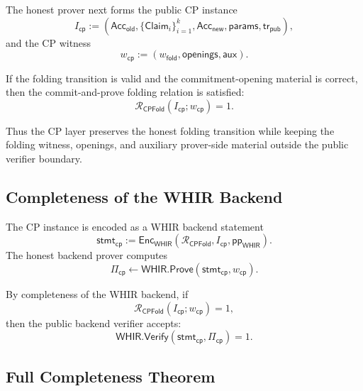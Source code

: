 \documentclass[11pt]{article}
\theoremstyle{definition}
\newcommand{\WHIR}{\mathsf{WHIR}}
\newcommand{\Acc}{\mathsf{Acc}}
\newcommand{\Verify}{\mathsf{Verify}}
\newcommand{\Prove}{\mathsf{Prove}}
\newcommand{\Rcp}{\mathcal{R}_{\mathsf{CPFold}}}
\begin{document}
The honest prover next forms the public CP instance
\[
  I_{\mathsf{cp}}
  :=
  \left(
    \Acc_{\mathsf{old}},
    \{\mathsf{Claim}_i\}_{i=1}^k,
    \Acc_{\mathsf{new}},
    \mathsf{params},
    \mathsf{tr}_{\mathsf{pub}}
  \right),
\]
and the CP witness
\[
  w_{\mathsf{cp}}
  :=
  \left(
    w_{\mathsf{fold}},
    \mathsf{openings},
    \mathsf{aux}
  \right).
\]

If the folding transition is valid and the commitment-opening material is
correct, then the commit-and-prove folding relation is satisfied:
\[
  \Rcp(I_{\mathsf{cp}};w_{\mathsf{cp}})=1.
\]

Thus the CP layer preserves the honest folding transition while keeping the
folding witness, openings, and auxiliary prover-side material outside the public
verifier boundary.

\subsection{Completeness of the WHIR Backend}
\label{sec:completeness-of-whir-backend}

The CP instance is encoded as a WHIR backend statement
\[
  \mathsf{stmt}_{\mathsf{cp}}
  :=
  \mathsf{Enc}_{\WHIR}
  \left(
    \Rcp,
    I_{\mathsf{cp}},
    \mathsf{pp}_{\WHIR}
  \right).
\]
The honest backend prover computes
\[
  \Pi_{\mathsf{cp}}
  \leftarrow
  \WHIR.\Prove(\mathsf{stmt}_{\mathsf{cp}},w_{\mathsf{cp}}).
\]

By completeness of the WHIR backend, if
\[
  \Rcp(I_{\mathsf{cp}};w_{\mathsf{cp}})=1,
\]
then the public backend verifier accepts:
\[
  \WHIR.\Verify(\mathsf{stmt}_{\mathsf{cp}},\Pi_{\mathsf{cp}})=1.
\]

\subsection{Full Completeness Theorem}
\label{sec:full-completeness-theorem}
\end{document}
